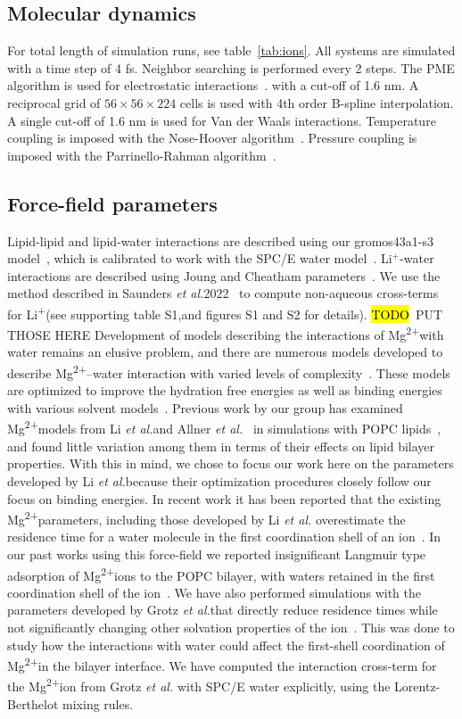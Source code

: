 \documentclass[12pt,openany,final]{book}
\newcommand{\etal}{\textit{et al.}}
\newcommand{\li}{Li\textsuperscript{+}}
\newcommand{\mg}{Mg\textsuperscript{2+}}
\newcommand{\TODO}{\hl{TODO}~}
\begin{document}
\subsection{Molecular dynamics}
For total length of simulation runs, see table~\ref{tab:ions}.
All systems are simulated with a time step of 4 fs.
Neighbor searching is performed every 2 steps.
The PME algorithm is used for electrostatic interactions~\cite{essmann:1995}.
with a cut-off of 1.6 nm.
A reciprocal grid of $56 \times 56 \times 224$ cells is used with 4th order B-spline interpolation.
A single cut-off of 1.6 nm is used for Van der Waals interactions.
Temperature coupling is imposed with the Nose-Hoover algorithm~\cite{nose:1983}.
Pressure coupling is imposed with the Parrinello-Rahman algorithm~\cite{parrinello:1981}.

\subsection{Force-field parameters}

Lipid-lipid and lipid-water interactions are described using our 
gromos43a1-s3 model~\cite{chiu:2009}, 
which is calibrated to work with the SPC/E water model~\cite{spce}. 
Li$^+$-water interactions 
are described using Joung and Cheatham parameters~\cite{joung:2008}. 
We use the method described in Saunders \etal 2022~\cite{saunders:2022} to compute non-aqueous
cross-terms for \li (see supporting table S1,and figures S1 and S2 for details). \TODO{PUT THOSE HERE}
Development of models describing the interactions of \mg with water remains an elusive
problem, and there are numerous
models developed to describe \mg--water interaction with varied levels of complexity~\cite{merzparams,villaparams,microparams,julian:2023:mg}.
These models are optimized to improve the hydration free energies as well as
binding energies with various solvent models~\cite{merzparams,villaparams,microparams}.  
Previous work by our group has examined \mg models
from Li \etal and Allner \etal~\cite{merzparams,villaparams} in simulations with POPC lipids~\cite{kruczek:2019}, 
and found little variation among them in terms of their effects on lipid bilayer properties. 
With this in mind, we chose to focus our work here on the parameters developed by Li \etal because
their optimization procedures closely follow our focus on binding energies.
In recent work it has been reported that the existing \mg parameters, 
including those developed by Li \etal
overestimate the residence time for a water molecule in the 
first coordination shell of an ion~\cite{microparams}. 
In our past works using this force-field we reported 
insignificant Langmuir type adsorption of \mg ions to the POPC bilayer,
with waters retained in the first coordination shell of the ion~\cite{kruczek:2019}. 
We have also performed simulations with the parameters developed by Grotz \etal that directly
reduce residence times while not significantly changing other solvation 
properties of the ion~\cite{grotz:2021:optimized,microparams}. 
This was done to study how the interactions with water
could affect the first-shell coordination of \mg in the bilayer interface. 
We have {computed} 
the interaction cross-term for the \mg ion from Grotz \etal
with SPC/E water explicitly, using {the Lorentz-Berthelot mixing rules.}
\end{document}

